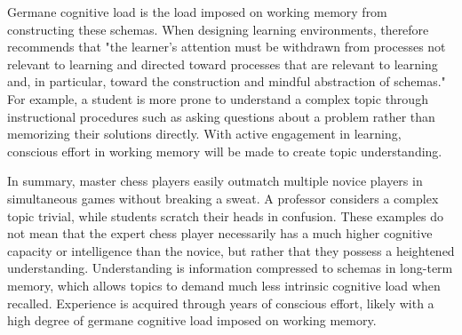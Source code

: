 Germane cognitive load is the load imposed on working memory from constructing these schemas. When designing learning environments, \textcite{sweller1988} therefore recommends that "the learner's attention must be withdrawn from processes not relevant to learning and directed toward processes that are relevant to learning and, in particular, toward the construction and mindful abstraction of schemas." For example, a student is more prone to understand a complex topic through instructional procedures such as asking questions about a problem rather than memorizing their solutions directly. 
With active engagement in learning, conscious effort in working memory will be made to create topic understanding. 

In summary, master chess players easily outmatch multiple novice players in simultaneous games without breaking a sweat. A professor considers a complex topic trivial, while students scratch their heads in confusion. These examples do not mean that the expert chess player necessarily has a much higher cognitive capacity or intelligence than the novice, but rather that they possess a heightened understanding. Understanding is information compressed to schemas in long-term memory, which allows topics to demand much less intrinsic cognitive load when recalled. Experience is acquired through years of conscious effort, likely with a high degree of germane cognitive load imposed on working memory.

\FloatBarrier